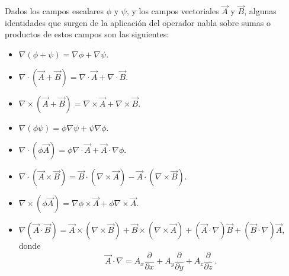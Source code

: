 Dados los campos escalares $\phi$ y $\psi$, y los campos vectoriales $\vec{A}$ y $\vec{B}$, algunas identidades que surgen de la aplicación del operador nabla sobre sumas o productos de estos campos son las siguientes:
\begin{itemize}
    \item $\nabla (\phi + \psi) = \nabla \phi + \nabla \psi$.
    \item $\nabla \cdot \left( \vec{A} + \vec{B} \right) = \nabla \cdot \vec{A} + \nabla \cdot \vec{B}$.
    \item $\nabla \times \left( \vec{A} + \vec{B} \right) = \nabla \times \vec{A} + \nabla \times \vec{B}$.
    \item $\nabla(\phi \psi) = \phi \nabla \psi + \psi \nabla \phi$.
    \item $\nabla \cdot \left( \phi \vec{A} \right) = \phi \nabla \cdot \vec{A} + \vec{A} \cdot \nabla \phi$.
    \item $\nabla \cdot (\vec{A} \times \vec{B}) = \vec{B} \cdot (\nabla \times \vec{A}) - \vec{A} \cdot (\nabla \times \vec{B})$.
    \item $\nabla \times (\phi \vec{A}) = \nabla \phi \times \vec{A} + \phi \nabla \times \vec{A}$.
    \item $\nabla(\vec{A} \cdot \vec{B}) = \vec{A} \times (\nabla \times \vec{B}) + \vec{B} \times (\nabla \times \vec{A}) + (\vec{A} \cdot \nabla) \vec{B} + (\vec{B} \cdot \nabla) \vec{A}$,
    donde 
    \begin{equation*}
        \vec{A} \cdot \nabla = A_x \frac{\partial}{\partial x} + A_y \frac{\partial}{\partial y} + A_z \frac{\partial}{\partial z} \ .
    \end{equation*}
\end{itemize}


